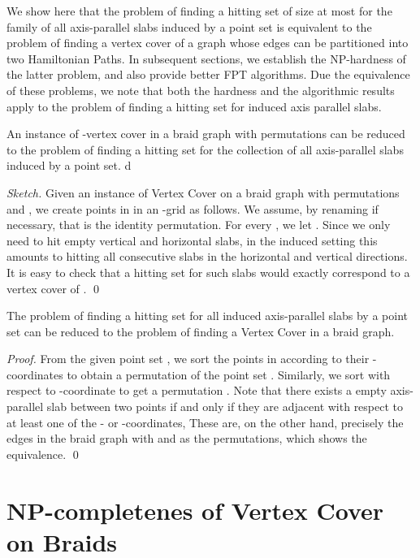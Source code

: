 \documentclass[svgnames]{llncs}
\newcommand{\braid}{braid}
\newcommand{\Braid}{Braid}
\begin{document}
We show here that the problem of finding a hitting set of size at most  for the family of all axis-parallel slabs induced by a point set is equivalent to the problem of 
finding a vertex cover of a graph whose edges can be partitioned into two Hamiltonian Paths. In subsequent sections, we establish the NP-hardness of the latter problem, and also provide better FPT algorithms. Due the equivalence of these problems, we note that both the hardness and the algorithmic results apply to the problem of finding a hitting set for induced axis parallel slabs. 

\begin{lemma}
An instance of -vertex cover in a \braid{} graph  with permutations  can be reduced to the problem of finding a hitting set for the collection of all axis-parallel slabs induced 
by a point set. 
\label{dgapstohp}
d\end{lemma}

\begin{proof}[Sketch] Given an instance of Vertex Cover on a braid graph  with permutations  and , we create  points in  in an -grid as follows. We assume, by renaming if necessary, that  is the identity permutation. For every , we let . Since we only need to hit empty vertical and horizontal slabs, in the induced setting this amounts to hitting all consecutive slabs in the horizontal and vertical directions. It is easy to check that a hitting set for such slabs would exactly correspond to a vertex cover of . \qed
\end{proof}



\begin{lemma}
The problem of finding a hitting set for all induced axis-parallel slabs by a point set  can be reduced to the problem of finding a Vertex Cover in a \braid{} graph. 
\end{lemma}
\begin{proof}From the given point set , we sort the points in  according to their -coordinates to obtain a permutation of the point set . Similarly, we sort with respect to -coordinate to get a permutation 
. Note that there exists a empty axis-parallel slab between two points if and only if they are adjacent with respect to at least one of the - or -coordinates, These are, on the other
hand, precisely the edges in the braid graph with  and  as the permutations, which shows the equivalence. 
\qed
\end{proof}


\section{NP-completenes of Vertex Cover on \Braid{}s}
\end{document}
